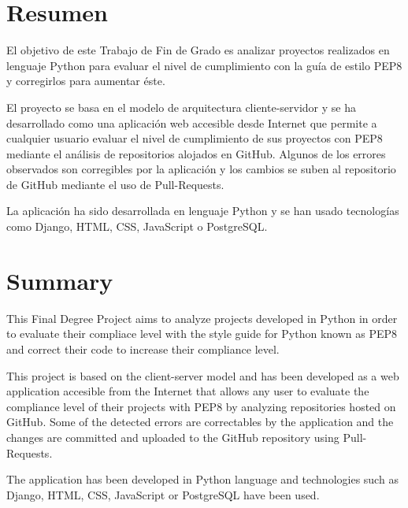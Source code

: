 \documentclass[a4paper, 12pt]{book}
\begin{document}
\chapter*{Resumen}

El objetivo de este Trabajo de Fin de Grado es analizar proyectos realizados en lenguaje Python para evaluar el nivel de cumplimiento con la guía de estilo PEP8 y corregirlos para aumentar éste.

El proyecto se basa en el modelo de arquitectura cliente-servidor y se ha desarrollado como una aplicación web accesible desde Internet que permite a cualquier usuario evaluar el nivel de cumplimiento de sus proyectos con PEP8 mediante el análisis de repositorios alojados en GitHub.
Algunos de los errores observados son corregibles por la aplicación y los cambios se suben al repositorio de GitHub mediante el uso de Pull-Requests.

La aplicación ha sido desarrollada en lenguaje Python y se han usado tecnologías como Django, HTML, CSS, JavaScript o PostgreSQL.


\chapter*{Summary}
This Final Degree Project aims to analyze projects developed in Python in order to evaluate their compliace level with the style guide for Python known as PEP8 and correct their code to increase their compliance level.

This project is based on the client-server model and has been developed as a web application accesible from the Internet that allows any user to evaluate the compliance level of their projects with PEP8 by analyzing repositories hosted on GitHub.
Some of the detected errors are correctables by the application and the changes are committed and uploaded to the GitHub repository using Pull-Requests.

The application has been developed in Python language and technologies such as Django, HTML, CSS, JavaScript or PostgreSQL have been used.

\end{document}
